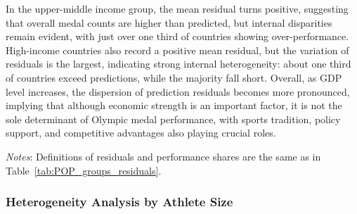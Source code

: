 \documentclass[11pt,twoside]{article}
\numberwithin{Theorem}{section}
\numberwithin{Definition}{section}
\numberwithin{Lemma}{section}
\numberwithin{Algorithm}{section}
\numberwithin{equation}{section}
\begin{document}
In the upper-middle income group, the mean residual turns positive, suggesting that overall medal counts are higher than predicted, but internal disparities remain evident, with just over one third of countries showing over-performance. High-income countries also record a positive mean residual, but the variation of residuals is the largest, indicating strong internal heterogeneity: about one third of countries exceed predictions, while the majority fall short. Overall, as GDP level increases, the dispersion of prediction residuals becomes more pronounced, implying that although economic strength is an important factor, it is not the sole determinant of Olympic medal performance, with sports tradition, policy support, and competitive advantages also playing crucial roles.


\begin{table}[H]
\centering
\caption{Prediction residuals by GDP groups}
\label{tab:gdp_groups_residuals}
\vspace{0.3em}
\begin{flushleft}
\footnotesize
\textit{Notes}: Definitions of residuals and performance shares are the same as in Table~\ref{tab:POP_groups_residuals}.
\end{flushleft}
\end{table}

\subsubsection{Heterogeneity Analysis by Athlete Size}
\end{document}
